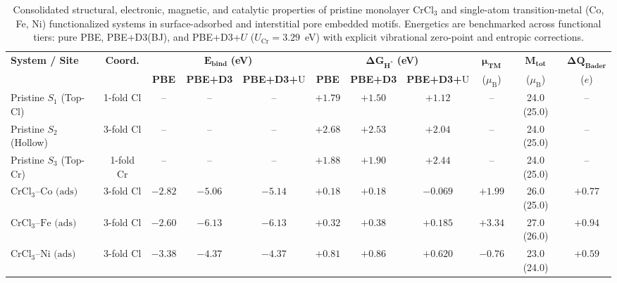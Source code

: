 \documentclass[journal=jacsat,manuscript=article]{achemso}
\begin{document}
{  \begin{table}[htbp]
    \centering
    \small
    \color{revcolor}
    \caption{{\color{revcolor}%
        Consolidated structural, electronic, magnetic, and catalytic properties of pristine monolayer $\text{CrCl}_3$ and single-atom transition-metal (Co, Fe, Ni) functionalized systems in surface-adsorbed and interstitial pore embedded motifs. Energetics are benchmarked across functional tiers: pure PBE, PBE+D3(BJ), and PBE+D3+$U$ ($U_{\text{Cr}} = 3.29$~eV) with explicit vibrational zero-point and entropic corrections.
    }}
    \label{tab:consolidated_properties}
    \vspace{0.2cm}
    \begin{adjustbox}{max width=\textwidth}
      \begin{tabular}{lcccccccccc}
        \toprule
        \textbf{System / Site} & \textbf{Coord.} & \multicolumn{3}{c}{$\boldsymbol{E_{\text{bind}}}$ \textbf{(eV)}} & \multicolumn{3}{c}{$\boldsymbol{\Delta G_{\text{H}^*}}$ \textbf{(eV)}} & $\boldsymbol{\mu_{\text{TM}}}$ & $\boldsymbol{M_{\text{tot}}}$ & $\boldsymbol{\Delta Q_{\text{Bader}}}$ \\
        \cmidrule(lr){3-5} \cmidrule(lr){6-8}
        & & \textbf{PBE} & \textbf{PBE+D3} & \textbf{PBE+D3+}U & \textbf{PBE} & \textbf{PBE+D3} & \textbf{PBE+D3+}U & ($\mu_{\text{B}}$) & ($\mu_{\text{B}}$) & ($e$) \\
        \midrule
        Pristine $S_1$ (Top-Cl)    & 1-fold Cl & -- & -- & -- & $+1.79$ & $+1.50$ & $+1.12$ & -- & 24.0 (25.0) & -- \\
        Pristine $S_2$ (Hollow)    & 3-fold Cl & -- & -- & -- & $+2.68$ & $+2.53$ & $+2.04$ & -- & 24.0 (25.0) & -- \\
        Pristine $S_3$ (Top-Cr)    & 1-fold Cr & -- & -- & -- & $+1.88$ & $+1.90$ & $+2.44$ & -- & 24.0 (25.0) & -- \\
        \midrule
        $\text{CrCl}_3\text{--Co (ads)}$ & 3-fold Cl & $-2.82$ & $-5.06$ & $-5.14$ & $+0.18$ & $+0.18$ & $\mathbf{-0.069}$ & $+1.99$ & 26.0 (25.0) & $+0.77$ \\
        $\text{CrCl}_3\text{--Fe (ads)}$ & 3-fold Cl & $-2.60$ & $-6.13$ & $-6.13$ & $\mathbf{+0.32}$ & $+0.38$ & $\mathbf{+0.185}$ & $+3.34$ & 27.0 (26.0) & $+0.94$ \\
        $\text{CrCl}_3\text{--Ni (ads)}$ & 3-fold Cl & $-3.38$ & $-4.37$ & $-4.37$ & $+0.81$ & $+0.86$ & $+0.620$ & $-0.76$ & 23.0 (24.0) & $+0.59$ \\

\end{tabular}
\end{adjustbox}
\end{table}}
\end{document}
